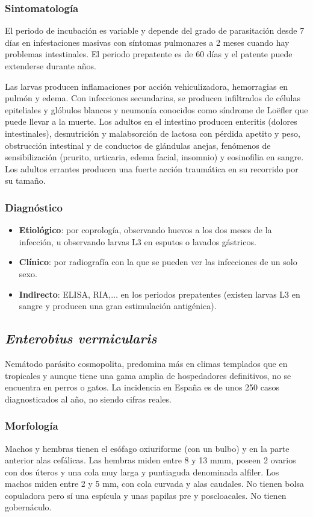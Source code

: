 \subsubsection{Sintomatología}
El periodo de incubación es variable y depende del grado de parasitación desde 7 días en infestaciones masivas con síntomas pulmonares a 2 meses cuando hay problemas intestinales. El periodo prepatente es de 60 días y el patente puede extenderse durante años.

Las larvas producen inflamaciones por acción vehiculizadora, hemorragias en pulmón y edema. Con infecciones secundarias, se producen infiltrados de células epiteliales y glóbulos blancos y neumonía conocidos como síndrome de Loëfler que puede llevar a la muerte. Los adultos en el intestino producen enteritis (dolores intestinales), desnutrición y malabsorción de lactosa con pérdida apetito y peso, obstrucción intestinal y de conductos de glándulas anejas, fenómenos de sensibilización (prurito, urticaria, edema facial, insomnio) y eosinofilia en sangre. Los adultos errantes producen una fuerte acción traumática en su recorrido por su tamaño.
\subsubsection{Diagnóstico}
\begin{itemize}[itemsep=0pt,parsep=0pt,topsep=0pt,partopsep=0pt]
	\item\textbf{Etiológico}: por coprología, observando huevos a los dos meses de la infección, u observando larvas L3 en esputos o lavados gástricos.
	\item \textbf{Clínico}: por radiografía con la que se pueden ver las infecciones de un solo sexo.
	\item \textbf{Indirecto}: ELISA, RIA,$\dots$ en los periodos prepatentes (existen larvas L3 en sangre y producen una gran estimulación antigénica).
\end{itemize}
\newpage
\subsection{\textit{Enterobius vermicularis}}
Nemátodo parásito cosmopolita, predomina más en climas templados que en tropicales y aunque tiene una gama amplia de hospedadores definitivos, no se encuentra en perros o gatos. La incidencia en España es de unos 250 casos diagnosticados al año, no siendo cifras reales.
\subsubsection{Morfología}
Machos y hembras tienen el esófago oxiuriforme (con un bulbo) y en la parte anterior alas cefálicas. Las hembras miden entre 8 y 13 mmm, poseen 2 ovarios con dos úteros y una cola muy larga y puntiaguda denominada alfiler. Los machos miden entre 2 y 5 mm, con cola curvada y alas caudales. No tienen bolsa copuladora pero sí una espícula y unas papilas pre y poscloacales. No tienen gobernáculo.

